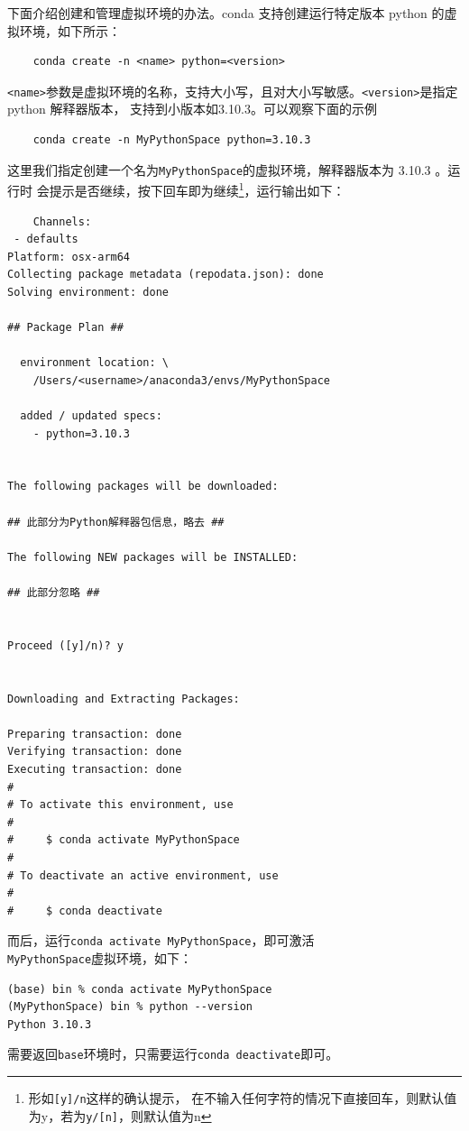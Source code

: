 下面介绍创建和管理虚拟环境的办法。conda 支持创建运行特定版本 python 的虚拟环境，如下所示：
\begin{lstlisting}
    conda create -n <name> python=<version>
\end{lstlisting}
\texttt{<name>}参数是虚拟环境的名称，支持大小写，且对大小写敏感。\texttt{<version>}是指定 python 解释器版本，
支持到小版本如3.10.3。可以观察下面的示例
\begin{lstlisting}
    conda create -n MyPythonSpace python=3.10.3
\end{lstlisting}
这里我们指定创建一个名为\texttt{MyPythonSpace}的虚拟环境，解释器版本为 3.10.3 。运行时
会提示是否继续，按下回车即为继续\footnote{形如\texttt{[y]/n}这样的确认提示，
在不输入任何字符的情况下直接回车，则默认值为y，若为\texttt{y/[n]}，则默认值为n}，运行输出如下：
\begin{lstlisting}
    Channels:
 - defaults
Platform: osx-arm64
Collecting package metadata (repodata.json): done
Solving environment: done

## Package Plan ##

  environment location: \
    /Users/<username>/anaconda3/envs/MyPythonSpace

  added / updated specs:
    - python=3.10.3


The following packages will be downloaded:

## 此部分为Python解释器包信息，略去 ##

The following NEW packages will be INSTALLED:

## 此部分忽略 ##


Proceed ([y]/n)? y


Downloading and Extracting Packages:
                                                                                                            
Preparing transaction: done
Verifying transaction: done
Executing transaction: done
#
# To activate this environment, use
#
#     $ conda activate MyPythonSpace
#
# To deactivate an active environment, use
#
#     $ conda deactivate

\end{lstlisting}
而后，运行\texttt{conda activate MyPythonSpace}，即可激活\\\texttt{MyPythonSpace}虚拟环境，如下：
\begin{lstlisting}
(base) bin % conda activate MyPythonSpace
(MyPythonSpace) bin % python --version
Python 3.10.3
\end{lstlisting}
需要返回\texttt{base}环境时，只需要运行\texttt{conda deactivate}即可。

